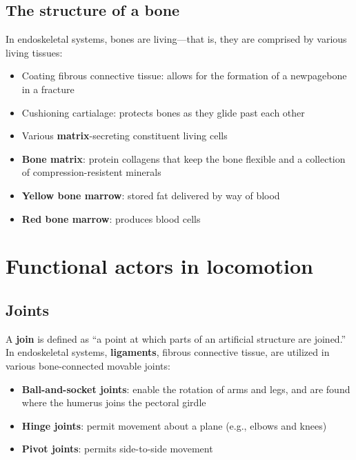 \documentclass{article}
\begin{document}
\subsection{The structure of a bone}

In endoskeletal systems, bones are living---that is, they are comprised by
various living tissues:

\begin{itemize}
    \item Coating fibrous connective tissue: allows for the formation of a
    newpagebone in a fracture
    \item Cushioning cartialage: protects bones as they glide past each other
    \item Various \textbf{matrix}-secreting constituent living cells
    \item \textbf{Bone matrix}: protein collagens that keep the bone flexible and
    a collection of compression-resistent minerals
    \item \textbf{Yellow bone marrow}: stored fat delivered by way of blood
    \item \textbf{Red bone marrow}: produces blood cells
\end{itemize}

\section{Functional actors in locomotion}

\subsection{Joints}

A \textbf{join} is defined as ``a point at which parts of an artificial
structure are joined.'' In endoskeletal systems, \textbf{ligaments}, fibrous
connective tissue, are utilized in various bone-connected movable joints:

\begin{itemize}
    \item \textbf{Ball-and-socket joints}: enable the rotation of arms and legs,
    and are found where the humerus joins the pectoral girdle
    \item \textbf{Hinge joints}: permit movement about a plane (e.g., elbows and
    knees)
    \item \textbf{Pivot joints}: permits side-to-side movement
\end{itemize}

\bigbreak{}
\end{document}
